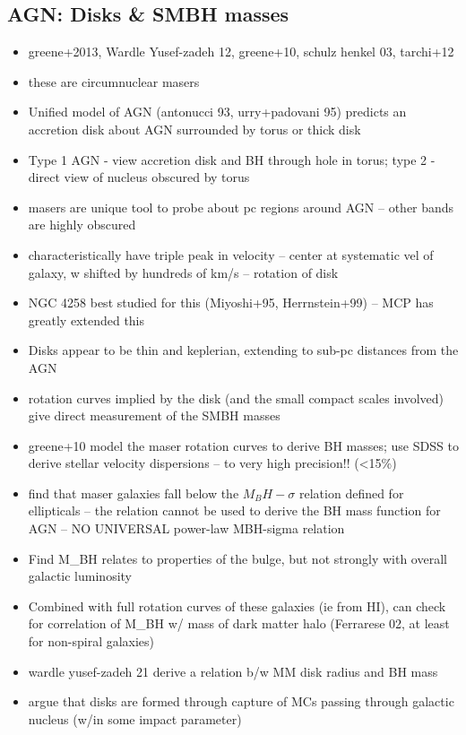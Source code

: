 \subsection{AGN: Disks \& SMBH masses}
\label{sub:h20_smbh_mass}

\begin{itemize}
\item greene+2013, Wardle Yusef-zadeh 12, greene+10, schulz henkel 03, tarchi+12
\item these are circumnuclear masers
\item Unified model of AGN (antonucci 93, urry+padovani 95) predicts an accretion disk about AGN surrounded by torus or thick disk
\item Type 1 AGN - view accretion disk and BH through hole in torus; type 2 - direct view of nucleus obscured by torus
\item masers are unique tool to probe about pc regions around AGN -- other bands are highly obscured
\item characteristically have triple peak in velocity -- center at systematic vel of galaxy, w shifted by hundreds of km/s -- rotation of disk
\item NGC 4258 best studied for this  (Miyoshi+95, Herrnstein+99) -- MCP has greatly extended this
\item Disks appear to be thin and keplerian, extending to sub-pc distances from the AGN
\item rotation curves implied by the disk (and the small compact scales involved) give direct measurement of the SMBH masses
\item greene+10 model the maser rotation curves to derive BH masses; use SDSS to derive stellar velocity dispersions -- to very high precision!! (<15\%)
\item find that maser galaxies fall below the $M_BH-\sigma$ relation defined for ellipticals -- the relation cannot be used to derive the BH mass function for AGN -- NO UNIVERSAL power-law MBH-sigma relation
\item Find M_BH relates to properties of the bulge, but not strongly with overall galactic luminosity
\item Combined with full rotation curves of these galaxies (ie from HI), can check for correlation of M_BH w/ mass of dark matter halo (Ferrarese 02, at least for non-spiral galaxies)
\item wardle yusef-zadeh 21 derive a relation b/w MM disk radius and BH mass
\item argue that disks are formed through capture of MCs passing through galactic nucleus (w/in some impact parameter)

\end{itemize}
